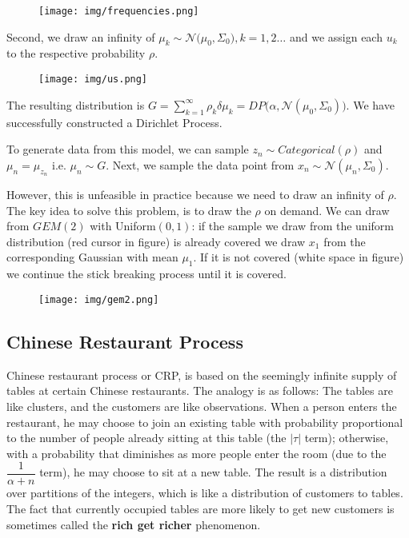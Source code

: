 \documentclass[twoside]{article}
\begin{document}
\begin{figure}[h]
    \centering
    \texttt{[image: img/frequencies.png]}
\end{figure}

Second, we draw an infinity of $\mu_{k} \sim \mathcal{N}\Big(\mu_{0}, \Sigma_{0}\Big), k=1,2 \ldots$  and we assign each $u_{k}$ to the respective probability $\rho$.

\begin{figure}[h]
    \centering
    \texttt{[image: img/us.png]}
\end{figure}

The resulting distribution is $G= \sum_{k=1}^{\infty} \rho_{k} \delta{\mu_{k}} = DP\Big(\alpha, \mathcal{N}(\mu_{0}, \Sigma_{0})\Big)$. We have successfully constructed a Dirichlet Process. 


To generate data from this model, we can sample $z_{n} \sim Categorical(\rho)$ and $\mu_{n} = \mu_{z_{n}}$  i.e. $\mu_{n} \sim G$. Next, we sample the data point from $x_{n} \sim \mathcal{N}(\mu_{n}, \Sigma_{0})$.

However, this is unfeasible in practice because we need to draw an infinity of $\rho$. The key idea to solve this problem, is to draw the $\rho$ on demand. We can draw from $GEM(2)$ with  Uniform$(0,1)$: if the sample we draw from the uniform distribution (red cursor in figure) is already covered we draw $x_{1}$ from the corresponding Gaussian with mean $\mu_{1}$. If it is not covered (white space in figure) we continue the stick breaking process until it is covered. 


\begin{figure}[h]
    \centering
    \texttt{[image: img/gem2.png]}
\end{figure}
\newpage
\subsection{Chinese Restaurant Process}
Chinese restaurant process or CRP, is based on the seemingly infinite supply of tables at certain Chinese restaurants. 
The analogy is as follows: The tables are like clusters, and the customers are like observations. When a person enters the restaurant, he may choose to join an existing table with probability proportional to the number of people already sitting at this table (the $|\tau|$ term); otherwise, with a probability that diminishes as more people enter the room (due to the $\dfrac{1}{\alpha + n} $ term), he may choose to sit at a new table. The result is a distribution over partitions of the integers, which is like a distribution of customers to tables.
The fact that currently occupied tables are more likely to get new customers is sometimes called the \textbf{rich get richer} phenomenon. 
\end{document}
